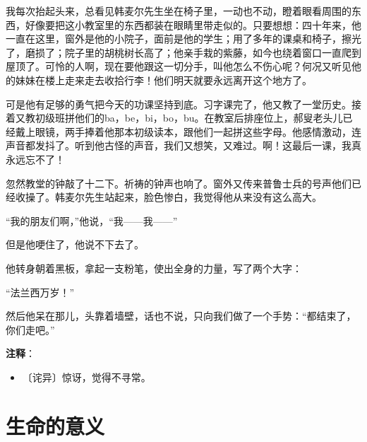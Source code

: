 \documentclass[12pt,UTF-8,openany]{ctexbook}
\begin{document}
\begin{normalsize}
    我每次抬起头来，总看见韩麦尔先生坐在椅子里，一动也不动，瞪着眼看周围的东西，好像要把这小教室里的东西都装在眼睛里带走似的。只要想想：四十年来，他一直在这里，窗外是他的小院子，面前是他的学生；用了多年的课桌和椅子，擦光了，磨损了；院子里的胡桃树长高了；他亲手栽的紫藤，如今也绕着窗口一直爬到屋顶了。可怜的人啊，现在要他跟这一切分手，叫他怎么不伤心呢？何况又听见他的妹妹在楼上走来走去收拾行李！他们明天就要永远离开这个地方了。
    
    可是他有足够的勇气把今天的功课坚持到底。习字课完了，他又教了一堂历史。接着又教初级班拼他们的ba，be，bi，bo，bu。在教室后排座位上，郝叟老头儿已经戴上眼镜，两手捧着他那本初级读本，跟他们一起拼这些字母。他感情激动，连声音都发抖了。听到他古怪的声音，我们又想笑，又难过。啊！这最后一课，我真永远忘不了！
    
    忽然教堂的钟敲了十二下。祈祷的钟声也响了。窗外又传来普鲁士兵的号声他们已经收操了。韩麦尔先生站起来，脸色惨白，我觉得他从来没有这么高大。
    
    “我的朋友们啊，”他说，“我——我——”
    
    但是他哽住了，他说不下去了。
    
    他转身朝着黑板，拿起一支粉笔，使出全身的力量，写了两个大字：
    
    “法兰西万岁！”
    
    然后他呆在那儿，头靠着墙壁，话也不说，只向我们做了一个手势：“都结束了，你们走吧。”
    
\end{normalsize}


\newpage

\textbf{注释}：

\vspace{-1em}

\begin{itemize}
    \setlength\itemsep{-0.2em}
    \item 〔诧异〕惊讶，觉得不寻常。
\end{itemize}

\chapter{生命的意义}
\end{document}
